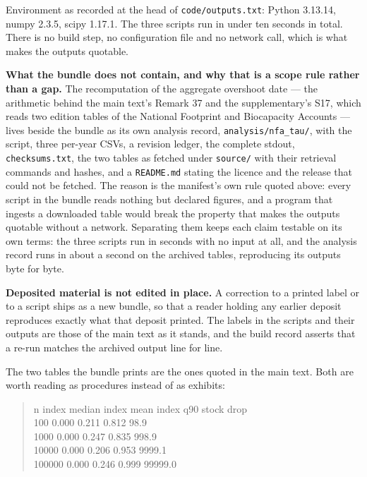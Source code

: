 \documentclass[11pt]{article}
\begin{document}
Environment as recorded at the head of \texttt{code/\allowbreak{}outputs.\allowbreak{}txt}: Python 3.13.14, numpy 2.3.5, scipy 1.17.1. The three scripts run in under ten seconds in total. There is no build step, no configuration file and no network call, which is what makes the outputs quotable.

\textbf{What the bundle does not contain, and why that is a scope rule rather than a gap.} The recomputation of the aggregate overshoot date --- the arithmetic behind the main text's Remark 37 and the supplementary's S17, which reads two edition tables of the National Footprint and Biocapacity Accounts --- lives beside the bundle as its own analysis record, \texttt{analysis/\allowbreak{}nfa\_tau/}, with the script, three per-year CSVs, a revision ledger, the complete stdout, \texttt{checksums.\allowbreak{}txt}, the two tables as fetched under \texttt{source/} with their retrieval commands and hashes, and a \texttt{README.\allowbreak{}md} stating the licence and the release that could not be fetched. The reason is the manifest's own rule quoted above: every script in the bundle reads nothing but declared figures, and a program that ingests a downloaded table would break the property that makes the outputs quotable without a network. Separating them keeps each claim testable on its own terms: the three scripts run in seconds with no input at all, and the analysis record runs in about a second on the archived tables, reproducing its outputs byte for byte.

\textbf{Deposited material is not edited in place.} A correction to a printed label or to a script ships as a new bundle, so that a reader holding any earlier deposit reproduces exactly what that deposit printed. The labels in the scripts and their outputs are those of the main text as it stands, and the build record asserts that a re-run matches the archived output line for line.

The two tables the bundle prints are the ones quoted in the main text. Both are worth reading as procedures instead of as exhibits:

\begin{quote}\ttfamily\footnotesize\raggedright\setlength{\parskip}{0pt}
       n   index median     index mean      index q90     stock drop\\
     100          0.000          0.211          0.812           98.9\\
    1000          0.000          0.247          0.835          998.9\\
   10000          0.000          0.206          0.953         9999.1\\
  100000          0.000          0.246          0.999        99999.0
\end{quote}
\end{document}
